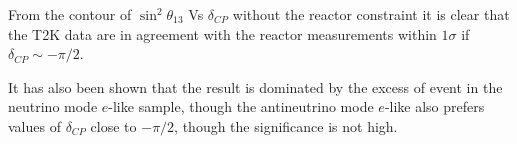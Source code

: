 From the contour of $\sin^2 \theta_{13}$ Vs $\delta_{CP}$ without the reactor constraint 
it is clear that the T2K data are in agreement with the reactor measurements within $1\sigma$ 
if $\delta_{CP} \sim -\pi/2$.

It has also been shown that the result is dominated by the excess of event in the neutrino mode
$e$-like sample, though the antineutrino mode $e$-like also prefers values of $\delta_{CP}$ 
close to $-\pi/2$, though the significance is not high.




%





\clearpage
